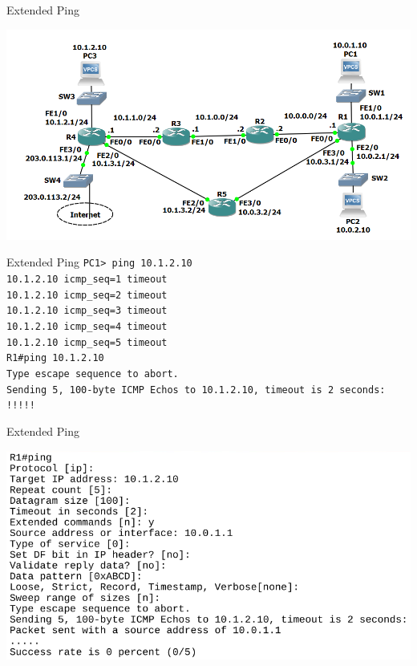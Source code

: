 \documentclass[pdflatex,compress,mathserif]{beamer}
\begin{document}
\begin{frame}{Extended Ping}
	\begin{center}
		\includegraphics[width=\linewidth]{img/img03}
	\end{center}
\end{frame}

\begin{frame}{Extended Ping}
	\texttt{PC1> ping
10.1.2.10 \\
	10.1.2.10   icmp\_seq=1 timeout\\
	10.1.2.10   icmp\_seq=2 timeout\\
	10.1.2.10   icmp\_seq=3 timeout\\
	10.1.2.10   icmp\_seq=4 timeout\\
	10.1.2.10   icmp\_seq=5 timeout}\\
	\[ \]
	\texttt{R1\#ping 10.1.2.10
\\
	Type escape sequence to abort.
\\
	Sending 5, 100-byte ICMP Echos to 10.1.2.10, timeout is 2
seconds:
\\
	!!!!!}
\end{frame}

\begin{frame}{Extended Ping}
	\begin{center}
		\includegraphics[width=\linewidth]{img/img04}
	\end{center}
\end{frame}
\end{document}
